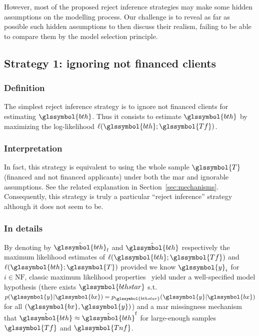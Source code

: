 However, most of the proposed reject inference strategies may make some hidden assumptions on the modelling process. Our challenge is to reveal as far as possible such hidden assumptions to then discuss their realism,  
failing to be able to compare them by the model selection principle.

\subsection{Strategy 1: ignoring not financed clients} \label{subsec:strat1}

\subsubsection{Definition}
The simplest reject inference strategy is to ignore not financed clients for estimating $\glssymbol{bth}$. Thus it consists to estimate $\glssymbol{bth}$ by maximizing the log-likelihood $\ell(\glssymbol{bth};\glssymbol{Tf})$.

\subsubsection{Interpretation}
In fact, this strategy is equivalent to using the whole sample $\glssymbol{T}$ (financed and not financed applicants) under both the \gls{mar} and ignorable assumptions. See the related explanation in Section~\ref{sec:mechanisms}. Consequently, this strategy is truly a particular ``reject inference'' strategy although it does not seem to be.

\subsubsection{In details}
By denoting by $\hat{\glssymbol{bth}}_\text{f}$ and $\hat{\glssymbol{bth}}$ respectively the maximum likelihood estimates of $\ell(\glssymbol{bth};\glssymbol{Tf})$ and $\ell(\glssymbol{bth};\glssymbol{T})$ provided we know $\glssymbol{y}_i$ for $i \in \text{NF}$, classic maximum likelihood properties~\cite{10.2307/1912526,zadrozny2004learning} yield under a well-specified model hypothesis (there exists $\glssymbol{bthstar}$ s.t.\ $p(\glssymbol{y} | \glssymbol{bx}) = p_{\glssymbol{bthstar}}(\glssymbol{y} | \glssymbol{bx})$ for all $(\glssymbol{bx},\glssymbol{y})$) and a \gls{mar} missingness mechanism that $\hat{\glssymbol{bth}} \approx \hat{\glssymbol{bth}}^\text{f}$ for large-enough samples $\glssymbol{Tf}$ and $\glssymbol{Tnf}$.



